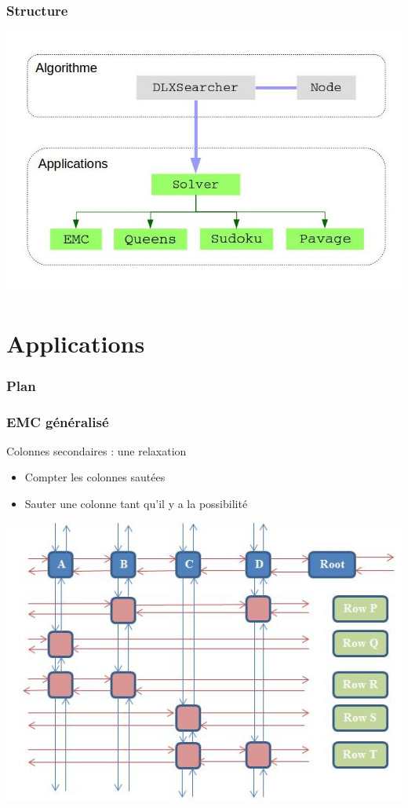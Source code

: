 \documentclass[12pt,t]{beamer}
\begin{document}
\begin{frame}
\frametitle{Structure}
\begin{center}
\includegraphics[width=1.0\textwidth]{structure.jpg}
\label{fig:structure}
\end{center}
\end{frame} 

\section{Applications}

\begin{frame}
\frametitle{Plan}
\tableofcontents[currentsection]
\end{frame}

\begin{frame}
\frametitle{EMC généralisé}
Colonnes secondaires : une relaxation
\begin{itemize}
  \item Compter les colonnes sautées
  \item Sauter une colonne tant qu'il y a la possibilité
\end{itemize}
\begin{center}
\includegraphics[width=.65\textwidth]{ImgDLinks.JPG}
\label{fig:dlxx}
\end{center}
\end{frame}
\end{document}
